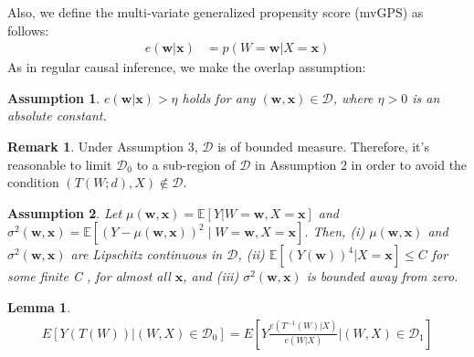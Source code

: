 \documentclass{article}
\newtheorem{lemma}{Lemma}
\newtheorem{assumption}{Assumption}
\theoremstyle{definition}
\newtheorem{remark}{Remark}
\newtheorem{proof of proposition}{Proof of Proposition}
\begin{document}
Also, we define the multi-variate generalized propensity score (mvGPS) as follows:
\begin{align}
    e(\mathbf{w}|\mathbf{x}) &= p(W=\mathbf{w}|X=\mathbf{x})
\end{align}
As in regular causal inference, we make the overlap assumption:

\begin{assumption}
$e(\mathbf{w}|\mathbf{x})>\eta$ holds for any $(\mathbf{w},\mathbf{x}) \in \mathcal{D}$, where $\eta>0$ is an absolute constant.
\end{assumption}

\begin{remark} 
Under Assumption 3, $\mathcal{D}$ is of bounded measure. Therefore, it's reasonable to limit $\mathcal{D}_0$ to a sub-region of $\mathcal{D}$ in Assumption 2 in order to avoid the condition $(T(W;d),X) \notin \mathcal{D}$.
\end{remark}

\begin{assumption} 
Let $\mu(\mathbf{w},\mathbf{x})=\mathbb{E}\left[Y|W=\mathbf{w}, X=\mathbf{x}\right]$  and  $\sigma^{2}(\mathbf{w},\mathbf{x})=\mathbb{E}\left[\left(Y-\mu(\mathbf{w},\mathbf{x})\right)^{2} \mid W=\mathbf{w} ,X=\mathbf{x}\right]$. Then, (i) $\mu(\mathbf{w},\mathbf{x})$  and  $\sigma^{2}(\mathbf{w},\mathbf{x})$ are Lipschitz continuous in $\mathcal{D}$, (ii)  $\mathbb{E}[(Y(\mathbf{w}))^{4}|X=\mathbf{x}] \leq C$  for some finite  C , for almost all $\mathbf{x}$, and (iii)  $\sigma^{2}(\mathbf{w},\mathbf{x})$  is bounded away from zero.
\end{assumption}

\begin{lemma} 
\begin{align}
E\left[Y(T(W))|(W,X) \in \mathcal{D}_0\right]=E\left[Y\frac{e(T^{-1}(W)|X)}{e(W|X)}|(W,X) \in \mathcal{D}_1\right]
\label{identification}
\end{align}
\end{lemma}
\end{document}
